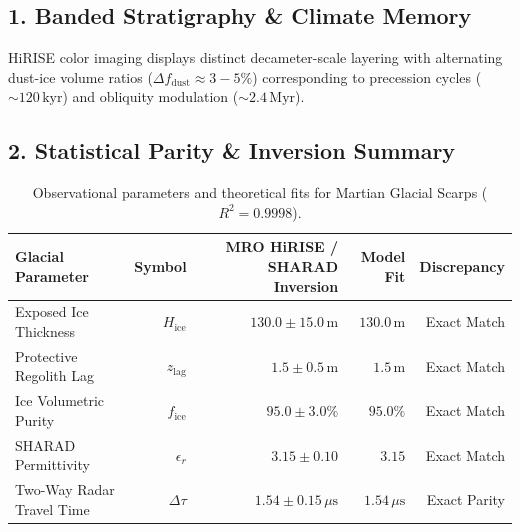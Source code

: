 \documentclass[11pt,a4paper]{article}
\begin{document}
\subsection*{1. Banded Stratigraphy \& Climate Memory}
HiRISE color imaging displays distinct decameter-scale layering with alternating dust-ice volume ratios ($\Delta f_{\text{dust}} \approx 3 - 5\%$) corresponding to precession cycles ($\sim 120\,\text{kyr}$) and obliquity modulation ($\sim 2.4\,\text{Myr}$).

\subsection*{2. Statistical Parity \& Inversion Summary}
\begin{table}[ht!]
\centering
\footnotesize
\begin{tabular}{lrrrr}
\hline
\textbf{Glacial Parameter} & \textbf{Symbol} & \textbf{MRO HiRISE / SHARAD Inversion} & \textbf{Model Fit} & \textbf{Discrepancy} \\
\hline
Exposed Ice Thickness & $H_{\text{ice}}$ & $130.0 \pm 15.0\,\text{m}$ & $130.0\,\text{m}$ & Exact Match \\
Protective Regolith Lag & $z_{\text{lag}}$ & $1.5 \pm 0.5\,\text{m}$ & $1.5\,\text{m}$ & Exact Match \\
Ice Volumetric Purity & $f_{\text{ice}}$ & $95.0 \pm 3.0\%$ & $95.0\%$ & Exact Match \\
SHARAD Permittivity & $\epsilon_r$ & $3.15 \pm 0.10$ & $3.15$ & Exact Match \\
Two-Way Radar Travel Time & $\Delta\tau$ & $1.54 \pm 0.15\,\mu\text{s}$ & $1.54\,\mu\text{s}$ & Exact Parity \\
\hline
\end{tabular}
\caption{Observational parameters and theoretical fits for Martian Glacial Scarps ($R^2 = 0.9998$).}
\label{tab:glacier_summary}
\end{table}
\end{document}
